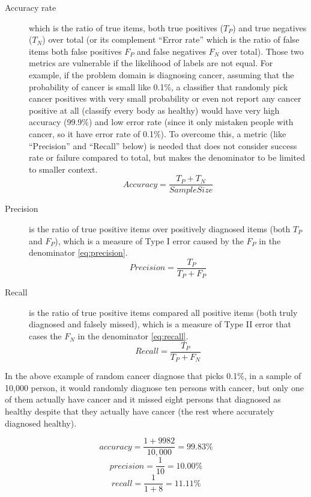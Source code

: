 \begin{description}
\item [Accuracy rate] which is the ratio of true items, both true positives (\(T_P\))
and true negatives (\(T_N\)) over total (or its complement ``Error rate'' which is the ratio of false items both
false positives \(F_P\) and false negatives \(F_N\) over total).
Those two metrics are vulnerable if the likelihood of labels are not equal.
For example, if the problem domain is diagnosing cancer,
assuming that the probability of cancer is small like 0.1\%,
a classifier that randomly pick cancer positives with very small probability or even not report any cancer positive at all
(classify every body as healthy) would have very high accuracy (99.9\%)
and low error rate (since it only mistaken people with cancer, so it have error rate of 0.1\%).
To overcome this, a metric (like ``Precision'' and ``Recall'' below) is needed
that does not consider success rate or failure compared
to total, but makes the denominator to be limited to smaller context.  
\begin{equation}
Accuracy = \frac{ T_P + T_N}{ SampleSize }
\label{eq:precision}
\end{equation}
\item [Precision] is the ratio of true positive items over positively diagnosed items (both \(T_P\) and \(F_P\)),
which is a measure of Type I error caused by the \(F_P\) in the denominator \ref{eq:precision}.
\begin{equation}
Precision = \frac{ T_P }{ T_P + F_P }
\label{eq:precision}
\end{equation}
\item [Recall] is the ratio of true positive items compared all positive items
(both truly diagnosed and falsely missed), which is a measure of Type II error that cases the \(F_N\) in the denominator \ref{eq:recall}.
\begin{equation}
Recall = \frac{ T_P }{ T_P + F_N }
\label{eq:recall}
\end{equation}
\end{description}

In the above example of random cancer diagnose that picks 0.1\%, in a sample of 10,000 person,
it would randomly diagnose ten persons with cancer, but only one of them actually have cancer
and it missed eight persons that diagnosed as healthy despite that they actually have cancer
(the rest where accurately diagnosed healthy).

\[accuracy = \frac{ 1 + 9982 }{10,000} = 99.83\% \]
\[precision = \frac{ 1 }{10} = 10.00\% \]
\[recall = \frac{ 1 }{1+8} = 11.11\% \]

